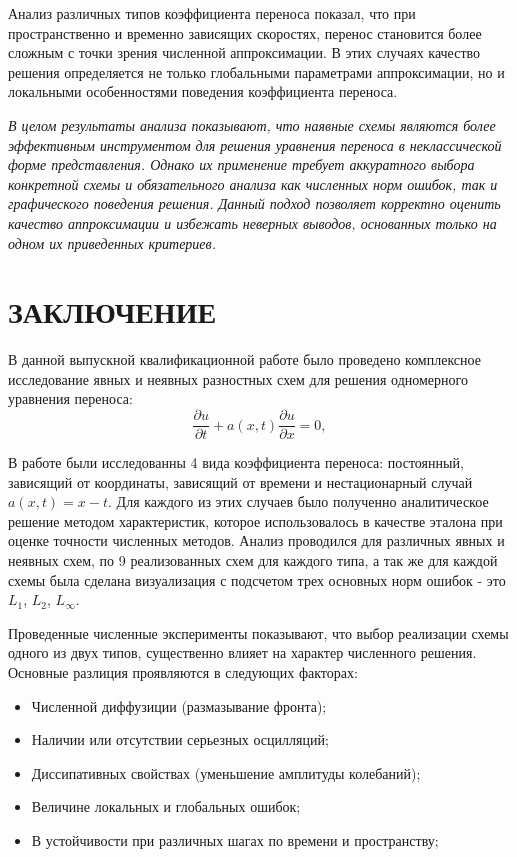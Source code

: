 \documentclass[a4paper,14pt]{extreport}
\begin{document}
Анализ различных типов коэффициента переноса показал, что при пространственно и временно зависящих скоростях, перенос становится более сложным с точки зрения численной аппроксимации. В этих случаях качество решения определяется не только глобальными параметрами аппроксимации, но и локальными особенностями поведения коэффициента переноса.

\textit{В целом результаты анализа показывают, что наявные схемы являются более эффективным инструментом для решения уравнения переноса в неклассической форме представления. Однако их применение требует аккуратного выбора конкретной схемы и обязательного анализа как численных норм ошибок, так и графического поведения решения. Данный подход позволяет корректно оценить качество аппроксимации и избежать неверных выводов, основанных только на одном их приведенных критериев.}

\chapter*{ЗАКЛЮЧЕНИЕ}

В данной выпускной квалификационной работе было проведено комплексное исследование явных и неявных разностных схем для решения одномерного уравнения переноса:
\begin{equation*}
	\frac{\partial u}{\partial t}
	+ a(x,t)\frac{\partial u}{\partial x} = 0,
\end{equation*}

В работе были исследованны 4 вида коэффициента переноса: постоянный, зависящий от координаты, зависящий от времени и нестационарный случай $a(x,t)=x-t$. Для каждого из этих случаев было полученно аналитическое решение методом характеристик, которое использовалось в качестве эталона при оценке точности численных методов. Анализ проводился для различных явных и неявных схем, по 9 реализованных схем для каждого типа, а так же для каждой схемы была сделана визуализация с подсчетом трех основных норм ошибок - это $L_1$, $L_2$, $L_\infty$.

Проведенные численные эксперименты показывают, что выбор реализации схемы одного из двух типов,  существенно влияет на характер численного решения. Основные разлиция проявляются в следующих факторах:
\begin{itemize}
	\item Численной диффузиции (размазывание фронта);
	\item Наличии или отсутствии серьезных осцилляций;
	\item Диссипативных свойствах (уменьшение амплитуды колебаний);
	\item Величине локальных и глобальных ошибок;
	\item В устойчивости при различных шагах по времени и пространству;
\end{itemize}
\end{document}
